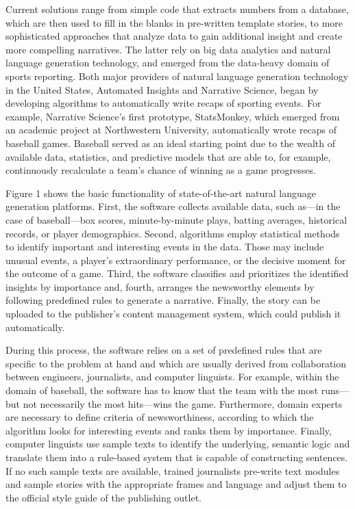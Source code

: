 \documentclass[notoc, symmetric, nobib, nols]{towcenter-guideto-book}
\begin{document}
Current solutions range from simple code that extracts numbers from a database, which are then used to fill in the blanks in pre-written template stories, to more sophisticated approaches that analyze data to gain additional insight and create more compelling narratives. The latter rely on big data analytics and natural language generation technology, and emerged from the data-heavy domain of sports reporting. Both major providers of natural language generation technology in the United States, Automated Insights and Narrative Science, began by developing algorithms to automatically write recaps of sporting events. For example, Narrative Science's first prototype, StatsMonkey, which emerged from an academic project at Northwestern University, automatically wrote recaps of baseball games.\autocite{levy12} Baseball served as an ideal starting point due to the wealth of available data, statistics, and predictive models that are able to, for example, continuously recalculate a team's chance of winning as a game progresses. 

Figure 1 shows the basic functionality of state-of-the-art natural language generation platforms.\autocites{reiter2000,doerr15} First, the software collects available data, such as---in the case of baseball---box scores, minute-by-minute plays, batting averages, historical records, or player demographics. Second, algorithms employ statistical methods to identify important and interesting events in the data. Those may include unusual events, a player's extraordinary performance, or the decisive moment for the outcome of a game. Third, the software classifies and prioritizes the identified insights by importance and, fourth, arranges the newsworthy elements by following predefined rules to generate a narrative. Finally, the story can be uploaded to the publisher's content management system, which could publish it automatically. 

During this process, the software relies on a set of predefined rules that are specific to the problem at hand and which are usually derived from collaboration between engineers, journalists, and computer linguists. For example, within the domain of baseball, the software has to know that the team with the most runs---but not necessarily the most hits---wins the game. Furthermore, domain experts are necessary to define criteria of newsworthiness, according to which the algorithm looks for interesting events and ranks them by importance. Finally, computer linguists use sample texts to identify the underlying, semantic logic and translate them into a rule-based system that is capable of constructing sentences. If no such sample texts are available, trained journalists pre-write text modules and sample stories with the appropriate frames and language and adjust them to the official style guide of the publishing outlet.
 
\end{document}
